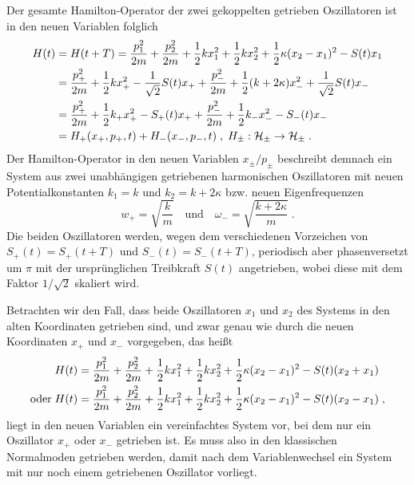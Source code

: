
  Der gesamte Hamilton-Operator der zwei gekoppelten getrieben Oszillatoren ist in den neuen Variablen folglich
  \begin{align}
    H(t) &= H(t+T) = \frac{p_1^2}{2m} + \frac{p_2^2}{2m} + \frac 1 2 kx_1^2 + \frac 1 2 kx_2^2 + \frac 1 2 \kappa(x_2-x_1)^2 - S(t)x_1 \notag\\
    &= \frac{p_+^2}{2m}+\frac{1}{2}kx_+^2-\frac{1}{\sqrt{2}}S(t)x_+  +
    \frac{p_-^2}{2m}+\frac{1}{2}(k+2\kappa)x_-^2+\frac{1}{\sqrt{2}}S(t)x_- \notag\\
    &= \frac{p_+^2}{2m}+\frac{1}{2}k_+x_+^2-S_+(t)x_+  +
    \frac{p_-^2}{2m}+\frac{1}{2}k_-x_-^2-S_-(t)x_- \notag\\
    &= H_+(x_+,p_+,t) + H_-(x_-,p_-,t) \;,\; H_\pm:\cal H_\pm \rightarrow \cal H_\pm \; .
    \label{gekoppelte_H_entkoppelt}
  \end{align}
  Der Hamilton-Operator in den neuen Variablen $x_{\pm}/p_{\pm}$ beschreibt demnach ein System aus zwei unabhängigen getriebenen harmonischen Oszillatoren mit neuen Potentialkonstanten $k_1=k$ und $k_2=k+2\kappa$ bzw. neuen Eigenfrequenzen
  \begin{equation}
    w_+=\sqrt{\frac{k}{m}} \quad\text{und}\quad \omega_-=\sqrt{\frac{k+2\kappa}{m}} \; .
    \label{neue_eigenfrequenzen}
  \end{equation}
  Die beiden Oszillatoren werden, wegen dem verschiedenen Vorzeichen von $S_+(t)=S_+(t+T)$ und $S_-(t)=S_-(t+T)$, periodisch aber phasenversetzt um $\pi$ mit der ursprünglichen Treibkraft $S(t)$ angetrieben, wobei diese mit dem Faktor $1/\sqrt{2}$ skaliert wird.

Betrachten wir den Fall, dass beide Oszillatoren $x_1$ und $x_2$ des Systems in den alten Koordinaten getrieben sind, und zwar genau wie durch die neuen Koordinaten $x_+$ und $x_-$ vorgegeben, das heißt
  \begin{align}
      &H(t) = \frac{p_1^2}{2m} + \frac{p_2^2}{2m} + \frac 1 2 kx_1^2 + \frac 1 2 kx_2^2 + \frac 1 2 \kappa(x_2-x_1)^2 - S(t)(x_2+x_1) \notag\\
      \text{oder} \; &H(t) = \frac{p_1^2}{2m} + \frac{p_2^2}{2m} + \frac 1 2 kx_1^2 + \frac 1 2 kx_2^2 + \frac 1 2 \kappa(x_2-x_1)^2 - S(t)(x_2-x_1) \;,
  \end{align}
  liegt in den neuen Variablen ein vereinfachtes System vor, bei dem nur ein Oszillator $x_+$ oder $x_-$ getrieben ist.
  Es muss also in den klassischen Normalmoden getrieben werden, damit nach dem Variablenwechsel ein System mit nur noch einem getriebenen Oszillator vorliegt.

